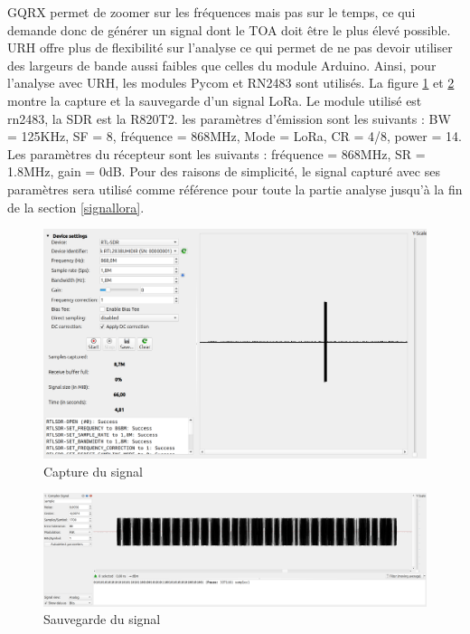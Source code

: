 GQRX permet de zoomer sur les fréquences mais pas sur le temps, ce qui demande donc de générer un signal dont le \ac{TOA} doit être le plus élevé possible. \ac{URH} offre plus de flexibilité sur l'analyse ce qui permet de ne pas devoir utiliser des largeurs de bande aussi faibles que celles du module Arduino. Ainsi, pour l'analyse avec \ac{URH}, les modules Pycom et RN2483 sont utilisés. La figure \ref{term303} et \ref{term304} montre la capture et la sauvegarde d'un signal LoRa. Le module utilisé est rn2483, la \ac{SDR} est la R820T2. les paramètres d'émission sont les suivants : \ac{BW} = 125KHz, \ac{SF} = 8, fréquence = 868MHz, Mode = \ac{LoRa}, \ac{CR} = 4/8, power = 14. Les paramètres du récepteur sont les suivants : fréquence = 868MHz, \ac{SR} = 1.8MHz, gain = 0dB. Pour des raisons de simplicité, le signal capturé avec ses paramètres sera utilisé comme référence pour toute la partie analyse jusqu'à la fin de la section \ref{signallora}.

\newpage

\begin{figure}[h]
\centering

\includegraphics[scale=0.17]{images/urh2n.png}
\caption{Capture du signal}
\label{term303}
\end{figure}

\begin{figure}[h]
\centering

\includegraphics[scale=0.11]{images/urh3n.png}
\caption{Sauvegarde du signal}
\label{term304}
\end{figure}

